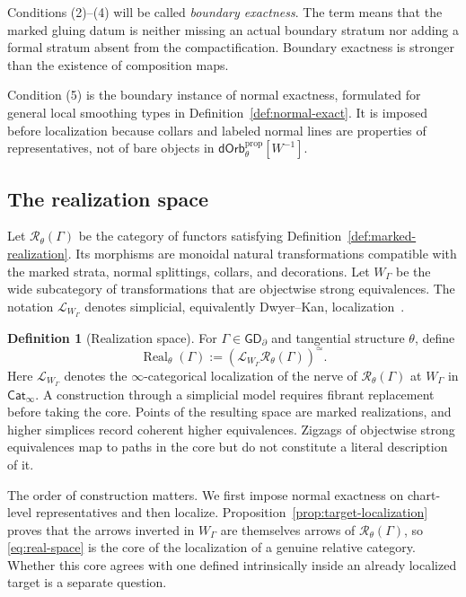 \documentclass[11pt,letterpaper,twoside]{article}
\theoremstyle{plain}
\theoremstyle{definition}
\newtheorem{definition}[theorem]{Definition}
\theoremstyle{remark}
\let\cite\citep
\newcommand{\BGrm}{\mathsf{GD}_{\partial}}
\newcommand{\dOrb}{\mathsf{dOrb}}
\newcommand{\Real}{\operatorname{Real}}
\begin{document}
Conditions (2)--(4) will be called \emph{boundary exactness}.  The term means that the marked gluing datum is neither missing an actual boundary stratum nor adding a formal stratum absent from the compactification.  Boundary exactness is stronger than the existence of composition maps.

Condition (5) is the boundary instance of normal exactness, formulated for general local smoothing types in Definition~\ref{def:normal-exact}.  It is imposed before localization because collars and labeled normal lines are properties of representatives, not of bare objects in \(\dOrb_\theta^{\mathrm{prop}}[W^{-1}]\).

\subsection{The realization space}

Let \(\mathcal R_\theta(\Gamma)\) be the category of functors satisfying Definition~\ref{def:marked-realization}.  Its morphisms are monoidal natural transformations compatible with the marked strata, normal splittings, collars, and decorations.  Let \(W_\Gamma\) be the wide subcategory of transformations that are objectwise strong equivalences.  The notation \(\mathcal L_{W_\Gamma}\) denotes simplicial, equivalently Dwyer--Kan, localization~\cite[\S\S1.1--1.2]{hinich2016}.

\begin{definition}[Realization space]\label{def:real-space}
For \(\Gamma\in\BGrm\) and tangential structure \(\theta\), define
\begin{equation}\label{eq:real-space}
 \Real_\theta(\Gamma)
 :=
 \left(\mathcal L_{W_\Gamma}
 \mathcal R_\theta(\Gamma)\right)^{\simeq}.
\end{equation}
Here \(\mathcal L_{W_\Gamma}\) denotes the \(\infty\)-categorical localization of the nerve of \(\mathcal R_\theta(\Gamma)\) at \(W_\Gamma\) in \(\mathsf{Cat}_\infty\).  A construction through a simplicial model requires fibrant replacement before taking the core.  Points of the resulting space are marked realizations, and higher simplices record coherent higher equivalences.  Zigzags of objectwise strong equivalences map to paths in the core but do not constitute a literal description of it.
\end{definition}

The order of construction matters.  We first impose normal exactness on chart-level representatives and then localize.  Proposition~\ref{prop:target-localization} proves that the arrows inverted in \(W_\Gamma\) are themselves arrows of \(\mathcal R_\theta(\Gamma)\), so \eqref{eq:real-space} is the core of the localization of a genuine relative category.  Whether this core agrees with one defined intrinsically inside an already localized target is a separate question.
\end{document}
